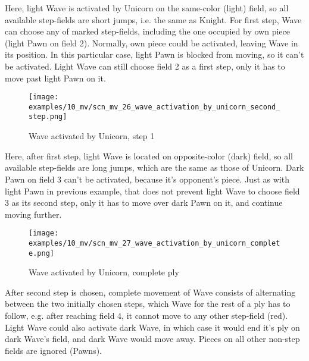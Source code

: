 \vspace*{-0.3\baselineskip}
Here, light Wave is activated by Unicorn on the same-color (light) field, so all available
step-fields are short jumps, i.e. the same as Knight. For first step, Wave can choose any of
marked step-fields, including the one occupied by own piece (light Pawn on field 2). Normally,
own piece could be activated, leaving Wave in its position. In this particular case, light Pawn
is blocked from moving, so it can't be activated. Light Wave can still choose field 2 as a first
step, only it has to move past light Pawn on it.

\clearpage %

\vspace*{-2.1\baselineskip}
\noindent
\begin{figure}[!h]
\texttt{[image: examples/10\_mv/scn\_mv\_26\_wave\_activation\_by\_unicorn\_second\_step.png]}
\caption{Wave activated by Unicorn, step 1}
\label{fig:scn_mv_26_wave_activation_by_unicorn_second_step}
\end{figure}

Here, after first step, light Wave is located on opposite-color (dark) field, so all available
step-fields are long jumps, which are the same as those of Unicorn. Dark Pawn on field 3 can't be
activated, because it's opponent's piece. Just as with light Pawn in previous example, that does
not prevent light Wave to choose field 3 as its second step, only it has to move over dark Pawn
on it, and continue moving further.

\clearpage %

\vspace*{-2.1\baselineskip}
\noindent
\begin{figure}[!h]
\texttt{[image: examples/10\_mv/scn\_mv\_27\_wave\_activation\_by\_unicorn\_complete.png]}
\caption{Wave activated by Unicorn, complete ply}
\label{fig:scn_mv_27_wave_activation_by_unicorn_complete}
\end{figure}

After second step is chosen, complete movement of Wave consists of alternating between the two initially
chosen steps, which Wave for the rest of a ply has to follow, e.g. after reaching field 4, it cannot move
to any other step-field (red). Light Wave could also activate dark Wave, in which case it would end it's
ply on dark Wave's field, and dark Wave would move away. Pieces on all other non-step fields are ignored
(Pawns).


